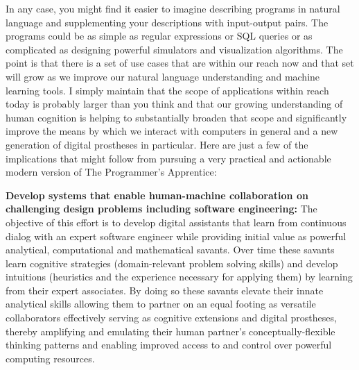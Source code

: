 In any case, you might find it easier to imagine describing programs in natural language and supplementing your descriptions with input-output pairs. The programs could be as simple as regular expressions or SQL queries or as complicated as designing powerful simulators and visualization algorithms. The point is that there is a set of use cases that are within our reach now and that set will grow as we improve our natural language understanding and machine learning tools. I simply maintain that the scope of applications within reach today is probably larger than you think and that our growing understanding of human cognition is helping to substantially broaden that scope and significantly improve the means by which we interact with computers in general and a new generation of digital prostheses in particular. Here are just a few of the implications that might follow from pursuing a very practical and actionable modern version of The Programmer's Apprentice:


{\bf{Develop systems that enable human-machine collaboration on challenging design problems including software engineering:}} The objective of this effort is to develop digital assistants that learn from continuous dialog with an expert software engineer while providing initial value as powerful analytical, computational and mathematical savants. Over time these savants learn cognitive strategies (domain-relevant problem solving skills) and develop intuitions (heuristics and the experience necessary for applying them) by learning from their expert associates. By doing so these savants elevate their innate analytical skills allowing them to partner on an equal footing as versatile collaborators \emdash{} effectively serving as cognitive extensions and digital prostheses, thereby amplifying and emulating their human partner's conceptually-flexible thinking patterns and enabling improved access to and control over powerful computing resources. 


